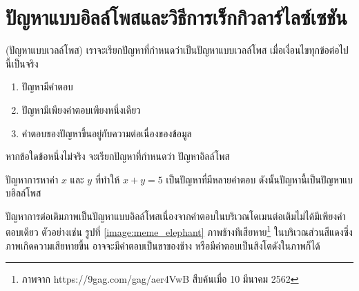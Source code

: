 \section{ปัญหาแบบอิลล์โพสและวิธีการเร็กกิวลาร์ไลซ์เซชัน}

\begin{Definition}
    (ปัญหาแบบเวลล์โพส) เราจะเรียกปัญหาที่กำหนดว่าเป็นปัญหาแบบเวลล์โพส เมื่อเงื่อนไขทุกข้อต่อไปนี้เป็นจริง
    \begin{enumerate}
        \item ปัญหามีคำตอบ
        \item ปัญหามีเพียงคำตอบเพียงหนึ่งเดียว
        \item คำตอบของปัญหาขึ้นอยู่กับความต่อเนื่องของข้อมูล
    \end{enumerate}    
    หากข้อใดข้อหนึ่งไม่จริง จะเรียกปัญหาที่กำหนดว่า ปัญหาอิลล์โพส
\end{Definition}


\begin{Example}
    ปัญหาการหาค่า $x$ และ $y$ ที่ทำให้ $x+y = 5$ เป็นปัญหาที่มีหลายคำตอบ ดังนั้นปัญหานี้เป็นปัญหาแบบอิลล์โพส
    \label{example:x_plus_y_5}
\end{Example}

\hspace{1cm} ปัญหาการต่อเติมภาพเป็นปัญหาแบบอิลล์โพสเนื่องจากคำตอบในบริเวณโดเมนต่อเติมไม่ได้มีเพียงคำตอบเดียว ตัวอย่างเช่น รูปที่ \ref{image:meme_elephant} ภาพช้างทีเสียหาย\footnote{ภาพจาก https://9gag.com/gag/aer4VwB สืบค้นเมื่อ 10 มีนาคม 2562} ในบริเวณส่วนสีแดงซึ่งภาพเกิดความเสียหายขึ้น อาจจะมีคำตอบเป็นขาของช้าง หรือมีคำตอบเป็นสิงโตดังในภาพก็ได้

